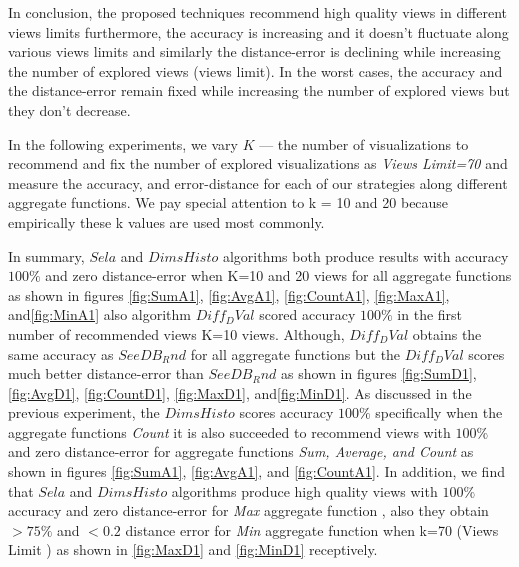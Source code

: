 
In conclusion, the proposed techniques recommend high quality views in different views limits furthermore, the accuracy is increasing and it doesn't fluctuate along various views limits and similarly the distance-error is declining while increasing the number of explored views (views limit). In the worst cases, the accuracy and the distance-error remain fixed while increasing the number of explored views but they don't decrease. \\
\par In the following experiments, we vary $K$ — the number of visualizations
to recommend and fix the number of explored visualizations as \emph{Views Limit=70} and measure the accuracy, and error-distance for each of our
strategies along different aggregate functions. We pay special attention to k = 10 and 20 because empirically these k values are used most commonly.

In summary, $Sela$ and $DimsHisto$ algorithms both produce results with accuracy $100\%$ and zero distance-error when K=10 and 20 views for all aggregate functions as shown in figures \ref{fig:SumA1}, \ref{fig:AvgA1}, \ref{fig:CountA1}, \ref{fig:MaxA1}, and\ref{fig:MinA1} also algorithm $Diff_DVal$ scored accuracy $100\%$ in the first number of recommended views K=10 views. Although, $Diff_DVal$ obtains the same accuracy as $SeeDB_Rnd$ for all aggregate functions but the $Diff_DVal$ scores much better distance-error than $SeeDB_Rnd$ as shown in figures \ref{fig:SumD1}, \ref{fig:AvgD1}, \ref{fig:CountD1}, \ref{fig:MaxD1}, and\ref{fig:MinD1}. As discussed in the previous experiment, the $DimsHisto$ scores accuracy $100\%$ specifically when the aggregate functions \emph{Count} it is also succeeded to recommend views with $100\%$ and zero distance-error for aggregate functions \emph{Sum, Average, and Count} as shown in figures \ref{fig:SumA1}, \ref{fig:AvgA1}, and \ref{fig:CountA1}. In addition, we find that $Sela$ and $DimsHisto$ algorithms produce high quality views with $100\%$ accuracy and zero distance-error for \emph{Max} aggregate function , also they obtain $>75\%$ and $<0.2$ distance error for \emph{Min} aggregate function when k=70 (Views Limit ) as shown in \ref{fig:MaxD1} and \ref{fig:MinD1} receptively.


